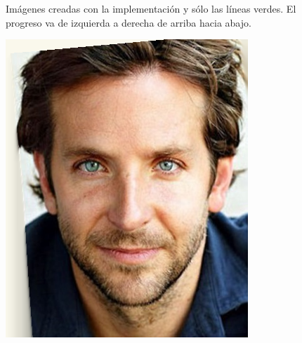 \documentclass[conference]{IEEEtran}
\begin{document}
\begin{figure}[H]
\begin{multicols}{3}
\end{multicols}
\caption{Imágenes creadas con la implementación y sólo las líneas verdes. El progreso va de izquierda a derecha de arriba hacia abajo.}
\end{figure}


\begin{figure}[H]
\begin{multicols}{3}
    \centering
    \includegraphics[width=1.0\linewidth]{results/faces/B/img01.png} \par

\end{multicols}
\end{figure}
\end{document}
